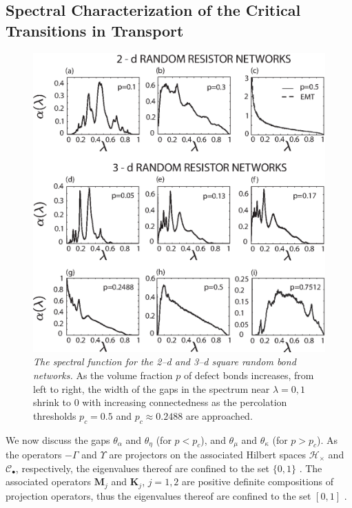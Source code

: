\documentclass[english,12pt,jmp,graphicx]{revtex4-1}
\begin{document}
\subsection{Spectral Characterization of the Critical Transitions in
  Transport} \label{sec:Spectral_Gap} 
%
%
\begin{figure}\label{fig:2D-RRN}
\includegraphics[width=39pc]{2-3-d_Random_Resistor_Networks.eps}%
\caption{\emph{The spectral function for the 2--d and 3--d square random bond
    networks.} As the volume fraction $p$ of defect bonds increases,
  from left to right, the width of the gaps in the spectrum near
  $\lambda=0,1$ shrink to 0 with increasing connectedness as the percolation
  thresholds $p_c=0.5$ and $p_c\approx0.2488$ are approached.}%
\end{figure}
%
We now discuss the gaps $\theta_\alpha$ and $\theta_\eta$ (for $p<p_c$), and $\theta_\mu$ and
$\theta_\kappa$ (for $p>p_c$). As the operators $-\Gamma$ and $\Upsilon$ are projectors on
the associated Hilbert spaces $\mathscr{H}_\times$ and $\mathscr{C}_\bullet$,
respectively, the eigenvalues thereof are confined to the set $\{0,1\}$
\cite{Reed-1980}. The associated operators $\mathbf{M}_j$ and $\mathbf{K}_j$,
$j=1,2$ are positive definite compositions of projection operators,
thus the eigenvalues thereof are confined to the set $[0,1]$
\cite{Golden:CMP-467}.
\end{document}
